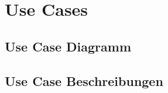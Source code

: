 \chapter{Use Cases}
\label{usecases}

\section{Use Case Diagramm}

\section{Use Case Beschreibungen}
\label{usecase:description}































